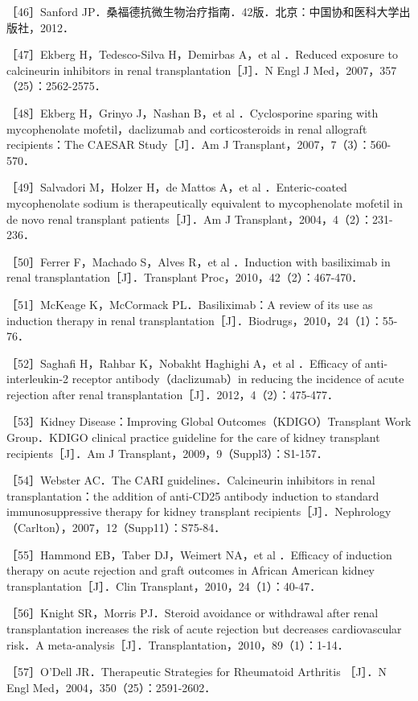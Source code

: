 ［46］Sanford
JP．桑福德抗微生物治疗指南．42版．北京：中国协和医科大学出版社，2012．

［47］Ekberg H，Tedesco-Silva H，Demirbas A，{et al} ．Reduced exposure
to calcineurin inhibitors in renal transplantation［J］．N Engl J
Med，2007，357（25）：2562-2575．

［48］Ekberg H，Grinyo J，Nashan B，{et al} ．Cyclosporine sparing with
mycophenolate mofetil，daclizumab and corticosteroids in renal allograft
recipients：The CAESAR Study［J］．Am J
Transplant，2007，7（3）：560-570．

［49］Salvadori M，Holzer H，de Mattos A，{et al} ．Enteric-coated
mycophenolate sodium is therapeutically equivalent to mycophenolate
mofetil in de novo renal transplant patients［J］．Am J
Transplant，2004，4（2）：231-236．

［50］Ferrer F，Machado S，Alves R，{et al} ．Induction with basiliximab
in renal transplantation［J］．Transplant Proc，2010，42（2）：467-470．

［51］McKeage K，McCormack PL．Basiliximab：A review of its use as
induction therapy in renal
transplantation［J］．Biodrugs，2010，24（1）：55-76．

［52］Saghafi H，Rahbar K，Nobakht Haghighi A，{et al} ．Efficacy of
anti-interleukin-2 receptor antibody（daclizumab）in reducing the
incidence of acute rejection after renal
transplantation［J］．2012，4（2）：475-477．

［53］Kidney Disease：Improving Global Outcomes（KDIGO）Transplant Work
Group．KDIGO clinical practice guideline for the care of kidney
transplant recipients［J］．Am J Transplant，2009，9（Suppl3）：S1-157．

［54］Webster AC．The CARI guidelines．Calcineurin inhibitors in renal
transplantation：the addition of anti-CD25 antibody induction to
standard immunosuppressive therapy for kidney transplant
recipients［J］．Nephrology（Carlton），2007，12（Supp11）：S75-84．

［55］Hammond EB，Taber DJ，Weimert NA，{et al} ．Efficacy of induction
therapy on acute rejection and graft outcomes in African American kidney
transplantation［J］．Clin Transplant，2010，24（1）：40-47．

［56］Knight SR，Morris PJ．Steroid avoidance or withdrawal after renal
transplantation increases the risk of acute rejection but decreases
cardiovascular risk．A
meta-analysis［J］．Transplantation，2010，89（1）：1-14．

［57］O'Dell JR．Therapeutic Strategies for Rheumatoid Arthritis
［J］．N Engl Med，2004，350（25）：2591-2602．

